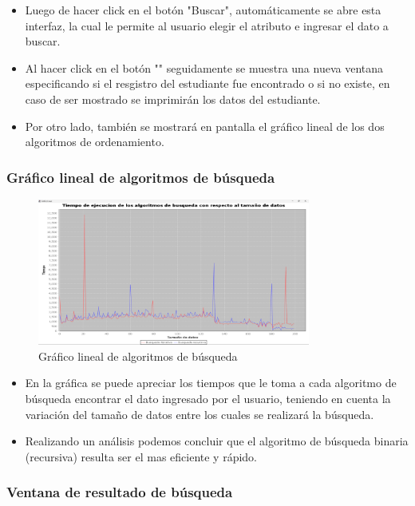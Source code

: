 \documentclass{article}
\begin{document}
    \begin{itemize}	
        \item Luego de hacer click en el botón "Buscar", automáticamente se abre esta interfaz, la cual le permite al usuario elegir el atributo e ingresar el dato a buscar.
        \item Al hacer click en el botón "" seguidamente se muestra una nueva ventana especificando si el resgistro del estudiante fue encontrado o si no existe, en caso de ser mostrado se imprimirán los datos del estudiante.
        \item Por otro lado, también se mostrará en pantalla el gráfico lineal de los dos algoritmos de ordenamiento.
	\end{itemize}

    \subsubsection{Gráfico lineal de algoritmos de búsqueda}

     \begin{figure}[H]
        \centering
	\includegraphics[width=0.8\textwidth,keepaspectratio]{img/Search_Grafic.png}
        \caption{Gráfico lineal de algoritmos de búsqueda}
    \end{figure}
 
	\begin{itemize}	
        \item En la gráfica se puede apreciar los tiempos que le toma a cada algoritmo de búsqueda encontrar el dato ingresado por el usuario, teniendo en cuenta la variación del tamaño de datos entre los cuales se realizará la búsqueda.
		\item Realizando un análisis podemos concluir que el algoritmo de búsqueda binaria (recursiva) resulta ser el mas eficiente y rápido.
	\end{itemize}

    \subsubsection{Ventana de resultado de búsqueda}
 
\end{document}
